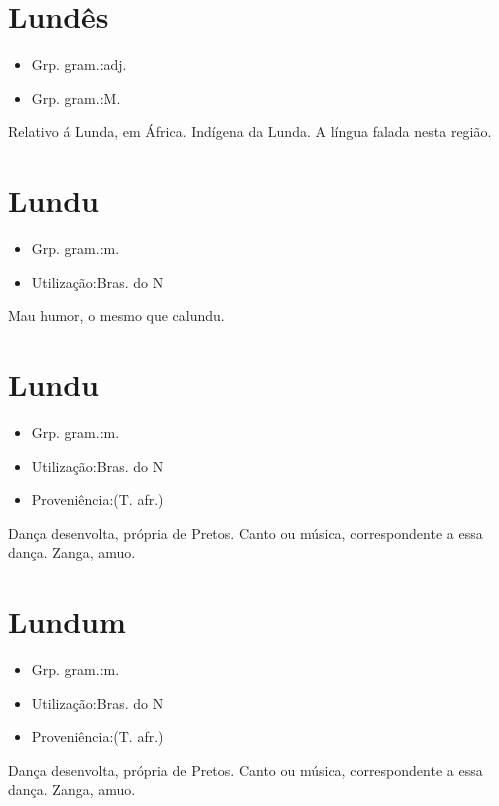 \section{Lundês}
\begin{itemize}
\item {Grp. gram.:adj.}
\end{itemize}
\begin{itemize}
\item {Grp. gram.:M.}
\end{itemize}
Relativo á Lunda, em África.
Indígena da Lunda.
A língua falada nesta região.
\section{Lundu}
\begin{itemize}
\item {Grp. gram.:m.}
\end{itemize}
\begin{itemize}
\item {Utilização:Bras. do N}
\end{itemize}
Mau humor, o mesmo que \textunderscore calundu\textunderscore .
\section{Lundu}
\begin{itemize}
\item {Grp. gram.:m.}
\end{itemize}
\begin{itemize}
\item {Utilização:Bras. do N}
\end{itemize}
\begin{itemize}
\item {Proveniência:(T. afr.)}
\end{itemize}
Dança desenvolta, própria de Pretos.
Canto ou música, correspondente a essa dança.
Zanga, amuo.
\section{Lundum}
\begin{itemize}
\item {Grp. gram.:m.}
\end{itemize}
\begin{itemize}
\item {Utilização:Bras. do N}
\end{itemize}
\begin{itemize}
\item {Proveniência:(T. afr.)}
\end{itemize}
Dança desenvolta, própria de Pretos.
Canto ou música, correspondente a essa dança.
Zanga, amuo.
